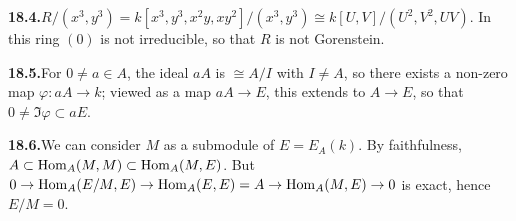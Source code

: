 \noindent\textbf{18.4.}\quad $R/(x^3, y^3) = k[x^3, y^3, x^2y, xy^2]/(x^3, y^3) \cong k[U, V]/(U^2, V^2, UV)$. In this
ring $(0)$ is not irreducible, so that $R$ is not Gorenstein.

\noindent\textbf{18.5.}\quad For $0 \neq a \in A$, the ideal $aA$ is $\cong A/I$ with $I \neq A$, so there exists a non-zero
map $\varphi\colon aA \to k$; viewed as a map $aA \to E$, this extends to $A \to E$, so that
$0 \neq \Im \varphi \subset aE$.

\noindent\textbf{18.6.}\quad We can consider $M$ as a submodule of $E = E_A(k)$. By faithfulness,
$A \subset \operatorname{Hom}_A(M, M) \subset \operatorname{Hom}_A(M, E)$. But $0 \to \operatorname{Hom}_A(E/M, E) \to
\operatorname{Hom}_A(E, E) = A \to \operatorname{Hom}_A(M, E) \to 0$ is exact, hence $E/M = 0$.

